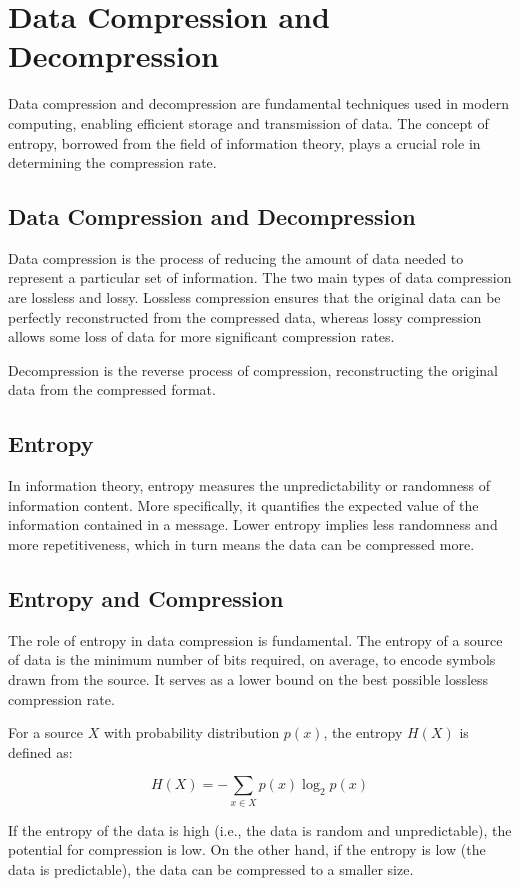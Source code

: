 \chapter{Data Compression and Decompression}

Data compression and decompression are fundamental techniques used in modern computing, enabling efficient storage and transmission of data. The concept of entropy, borrowed from the field of information theory, plays a crucial role in determining the compression rate.

\section{Data Compression and Decompression}

Data compression is the process of reducing the amount of data needed to represent a particular set of information. The two main types of data compression are lossless and lossy. Lossless compression ensures that the original data can be perfectly reconstructed from the compressed data, whereas lossy compression allows some loss of data for more significant compression rates. 

Decompression is the reverse process of compression, reconstructing the original data from the compressed format.

\section{Entropy}

In information theory, entropy measures the unpredictability or randomness of information content. More specifically, it quantifies the expected value of the information contained in a message. Lower entropy implies less randomness and more repetitiveness, which in turn means the data can be compressed more.

\section{Entropy and Compression}

The role of entropy in data compression is fundamental. The entropy of a source of data is the minimum number of bits required, on average, to encode symbols drawn from the source. It serves as a lower bound on the best possible lossless compression rate. 

For a source $X$ with probability distribution $p(x)$, the entropy $H(X)$ is defined as:

\begin{equation}
H(X) = - \sum_{x \in X} p(x) \log_2 p(x)
\end{equation}

If the entropy of the data is high (i.e., the data is random and unpredictable), the potential for compression is low. On the other hand, if the entropy is low (the data is predictable), the data can be compressed to a smaller size.

\